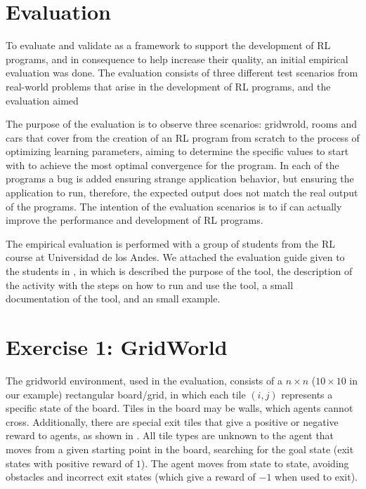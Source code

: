 
\section{Evaluation}
\label{sec:evaluation}

To evaluate and validate \flik as a framework to support the development 
of \ac{RL} programs, and in consequence to help increase their quality, 
an initial empirical evaluation was done. The evaluation consists of three different test scenarios 
from real-world problems that arise in the development of \ac{RL} programs, and the evaluation aimed

The purpose of the evaluation is to observe three scenarios: gridwrold, rooms and cars that cover from 
the creation of an \ac{RL} program from scratch to the process of optimizing 
learning parameters, aiming to determine the specific values to start with 
to achieve the most optimal convergence for the program. In each of the programs a bug 
is added ensuring strange application behavior, but ensuring the application to run, 
therefore, the expected output does not match the real output of the programs. The intention of 
the evaluation scenarios is to if \flik can actually improve the performance and development of \ac{RL}
programs.

The empirical evaluation is performed with a group of students from the \ac{RL} course at Universidad de 
los Andes. We attached the evaluation guide given to the students in , in which 
is described the purpose of the tool, the description of the activity with the steps on how to run and 
use the tool, a small documentation of the tool, and an small example.

\section{Exercise 1: GridWorld}
\label{sec:grid-eval}

The gridworld environment, used in the evaluation, consists of a $n\times n$ ($10\times 10$ in our example) rectangular 
board/grid, in which each tile $(i,j)$ represents a specific state of the board. Tiles in the board may be 
walls, which agents cannot cross. Additionally, there are special exit 
tiles that give a positive or negative reward to agents, as shown in . All tile types 
are unknown to the agent that moves from a given starting point in the board, searching for the goal 
state (\ie exit states with positive reward of $1$). The agent moves from state to state, avoiding 
obstacles and incorrect exit states (which give a reward of $-1$ when used to exit). 

